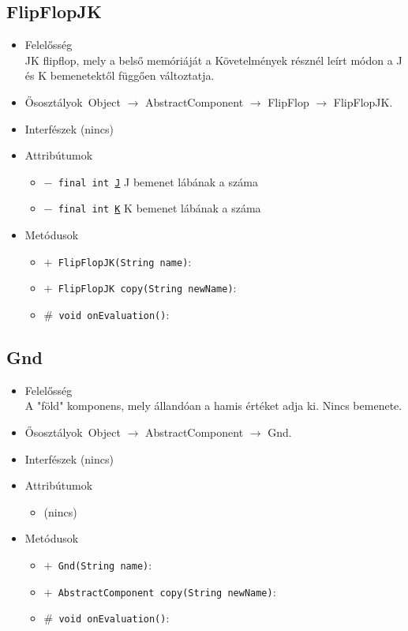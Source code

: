 \subsection{FlipFlopJK}
\begin{itemize}
\item Felelősség\\
JK flipflop, mely a belső memóriáját a Követelmények résznél leírt módon  a J és K bemenetektől függően változtatja.
\item Ősosztályok\ Object $\rightarrow{}$ AbstractComponent $\rightarrow{}$ FlipFlop $\rightarrow{}$ FlipFlopJK.
\item Interfészek (nincs)
\item Attribútumok $\ $
\begin{itemize}
	\item[] \texttt{$-$ final int \underline{J}} J bemenet lábának a száma
	\item[] \texttt{$-$ final int \underline{K}} K bemenet lábának a száma
\end{itemize}
\item Metódusok$\ $
\begin{itemize}
	\item[] \texttt{$+$ FlipFlopJK(String name)}: 
	\item[] \texttt{$+$ FlipFlopJK copy(String newName)}: 
	\item[] \texttt{$\#$ void onEvaluation()}: 
\end{itemize}
\end{itemize}

\subsection{Gnd}
\begin{itemize}
\item Felelősség\\
A "föld" komponens, mely állandóan a hamis értéket adja ki. Nincs bemenete.
\item Ősosztályok\ Object $\rightarrow{}$ AbstractComponent $\rightarrow{}$ Gnd.
\item Interfészek (nincs)
\item Attribútumok $\ $
\begin{itemize}
\item (nincs)
\end{itemize}
\item Metódusok$\ $
\begin{itemize}
	\item[] \texttt{$+$ Gnd(String name)}: 
	\item[] \texttt{$+$ AbstractComponent copy(String newName)}: 
	\item[] \texttt{$\#$ void onEvaluation()}: 
\end{itemize}
\end{itemize}

